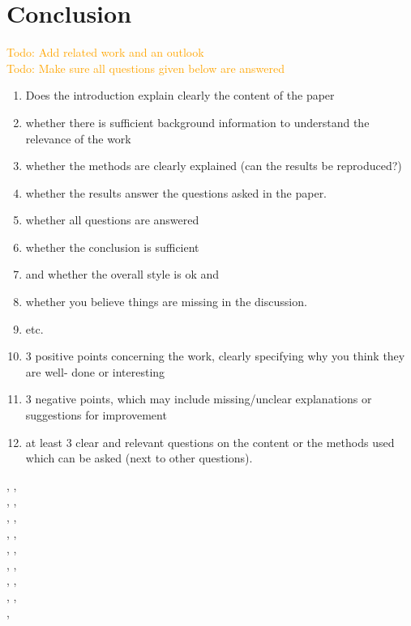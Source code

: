 \documentclass[letterpaper]{article}
\newcommand\todo[1]{\textcolor{orange}{Todo: #1}}
\begin{document}
\section{Conclusion}
\todo{Add related work and an outlook}
\\\todo{Make sure all questions given below are answered}
\begin{enumerate}
 \item Does the introduction explain clearly the content of the paper
 \item whether there is sufficient background information to understand the relevance of the work
 \item whether the methods are clearly explained (can the results be reproduced?)
 \item whether the results answer the questions asked in the paper.
 \item whether all questions are answered
 \item whether the conclusion is sufficient
 \item and whether the overall style is ok and
 \item whether you believe things are missing in the discussion.
 \item etc.
 \item 3 positive points concerning the work, clearly specifying why you think they are well-
       done or interesting
 \item 3 negative points, which may include missing/unclear explanations or suggestions for
       improvement
 \item at least 3 clear and relevant questions on the content or the methods used which can be asked (next to other questions).
\end{enumerate}

\citep{carroll2005task}, \citep{garant2015accelerating},\\ \citep{ghavamzadeh2006hierarchical}, \citep{gmytrasiewicz2005framework},\\ \citep{guestrin2002multiagent}, \citep{kitano1999robocup},\\ \citep{lazaric2008transfer}, \citep{littman2001value},\\ \citep{nair2005networked}, \citep{nedic2009distributed},\\ \citep{oliehoek2008exploiting}, \citep{price2003accelerating},\\ \citep{renyi1961measures}, \citep{taylor2009transfer},\\ \citep{vickrey2002multi}, \citep{witwicki2010influence},\\ \citep{zhang2010self}, \citep{zhang2013coordinating}

\footnotesize


\end{document}
